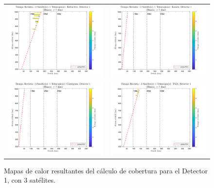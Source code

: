 \begin{landscape}
\begin{figure}[p]
\centering
\vspace*{0.3cm}
\setlength{\tabcolsep}{4pt}
\renewcommand{\arraystretch}{0}
\begin{tabular}{cc}
\includegraphics[width=0.48\linewidth]{4.Payload/Coverage/heatmap_3 Satelite(s); 1 Telescopio(s): Refractivo; Detector 1.jpg} &
\includegraphics[width=0.48\linewidth]{4.Payload/Coverage/heatmap_3 Satelite(s); 1 Telescopio(s): Korsch; Detector 1.jpg} \\
\includegraphics[width=0.48\linewidth]{4.Payload/Coverage/heatmap_3 Satelite(s); 1 Telescopio(s): Cassegrain; Detector 1.jpg} &
\includegraphics[width=0.48\linewidth]{4.Payload/Coverage/heatmap_3 Satelite(s); 1 Telescopio(s): TMA; Detector 1.jpg} \\
\end{tabular}
\caption{Mapas de calor resultantes del cálculo de cobertura para el Detector 1, con 3 satélites.}
\end{figure}
\end{landscape}

